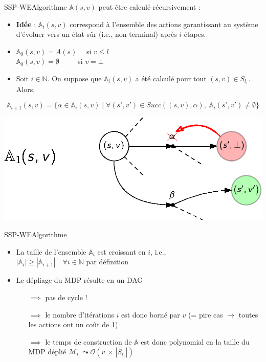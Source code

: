 \documentclass[compress]{beamer}
\begin{document}
\begin{frame}{SSP-WE}{Algorithme}
\footnotesize
$\mathbb{A}(s, v)$ peut être calculé récursivement :
\begin{itemize}
  \item \textbf{\color{fibeamer@orange}Idée} : $\mathbb{A}_i(s, v)$ correspond à l'ensemble des actions garantissant au système d'évoluer vers un état sûr (i.e., non-terminal) après $i$ étapes.
  \item $\mathbb{A}_0(s, v) = A(s) \quad $ si $v \leq l$ \\
        $\mathbb{A}_0(s, v) = \emptyset \quad \quad \;$ si $v = \bot$
  \item Soit $i \in \mathbb{N}$. On suppose que $\mathbb{A}_i(s, v)$ a été
    calculé pour tout $(s, v) \in S_{l_1}$. Alors,
\end{itemize}
{
    \[
      \mathbb{A}_{i+1}(s, v) = \{ \alpha \in \mathbb{A}_i(s, v) \; | \;
        \forall (s', v') \in Succ( (s, v), \alpha ), \; \mathbb{A}_i(s', v') \neq \emptyset \}
    \]
}
\begin{center}
  \includegraphics[width=0.5\linewidth]{resources/attractor}
\end{center}
\end{frame}

\begin{frame}{SSP-WE}{Algorithme}
  \begin{itemize}
    \item La taille de l'ensemble $\mathbb{A}_i$ est croissant en $i$, i.e., \\
      $|\mathbb{A}_{i}| \geq |\mathbb{A}_{i+1}| \quad \forall i \in \mathbb{N}$ par définition
    \item Le dépliage du MDP résulte en un DAG
    \begin{itemize}
      \item[$\implies$] pas de cycle !
      \item[$\implies$] le nombre d'itérations $i$ est donc borné par $v$ (= pire cas $\rightarrow$ toutes les actions ont un coût de 1)
      \item[$\implies$] le temps de construction de $\mathbb{A}$ est donc polynomial en la taille du MDP déplié $\mathcal{M}_{l_1} \leadsto \mathcal{O}(v \, \times \, |S_{l_1}|)$
    \end{itemize}
  \end{itemize}
\end{frame}
\end{document}
